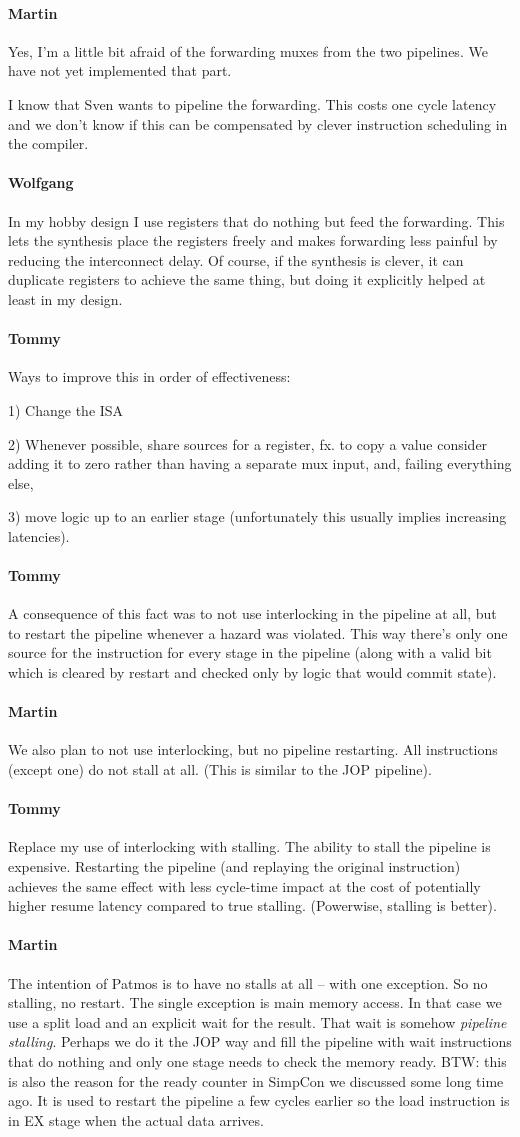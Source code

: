 \documentclass{IEEEtran}
\newcommand{\comment}[3]{\paragraph*{\textbf{#1}}{\color{#3}#2}}
\newcommand{\tommy}[1]{\comment{Tommy}{#1}{Red}}
\newcommand{\wolf}[1]{\comment{Wolfgang}{#1}{OliveGreen}}
\newcommand{\martin}[1]{\comment{Martin}{#1}{Blue}}
\begin{document}
\martin{Yes, I'm a little bit afraid of the forwarding muxes from the
two pipelines. We have not yet implemented that part.

I know that Sven wants to pipeline the forwarding. This
costs one cycle latency and we don't know if this can be
compensated by clever instruction scheduling in the
compiler.}

\wolf{In my hobby design I use registers that do nothing but feed the
forwarding. This lets the synthesis place the registers freely and
makes forwarding less painful by reducing the interconnect delay. Of
course, if the synthesis is clever, it can duplicate registers to
achieve the same thing, but doing it explicitly helped at least in my
design.}

\tommy{Ways to improve this in order of effectiveness:

 1) Change the ISA

 2) Whenever possible, share sources for a register, fx. to copy a
    value consider adding it to zero rather than having a separate
    mux input, and, failing everything else,

 3) move logic up to an earlier stage (unfortunately this usually
    implies increasing latencies).}

 \tommy{A consequence of this fact was to not use interlocking in the
 pipeline at all, but to restart the pipeline whenever a hazard
 was violated. This way there's only one source for the
 instruction for every stage in the pipeline (along with a valid
 bit which is cleared by restart and checked only by logic that
 would commit state).}

\martin{We also plan to not use interlocking, but no pipeline restarting.
All instructions (except one) do not stall at all. (This is similar
to the JOP pipeline).}

\tommy{Replace my use of interlocking with stalling. The ability to
  stall the pipeline is expensive. Restarting the pipeline (and
  replaying the original instruction) achieves the same effect with
  less cycle-time impact at the cost of potentially higher resume
  latency compared to true stalling. (Powerwise, stalling is better).}

\martin{The intention of Patmos is to have no stalls at all -- with one
exception. So no stalling, no restart. The single exception is main
memory access. In that case we use a split load and an explicit wait
for the result. That wait is somehow \emph{pipeline stalling}. Perhaps
we do it the JOP way and fill the pipeline with wait instructions that
do nothing and only one stage needs to check the memory ready.
BTW: this is also the reason for the ready counter in SimpCon we
discussed some long time ago. It is used to restart the pipeline a
few cycles earlier so the load instruction is in EX stage when the actual
data arrives.}
\end{document}
